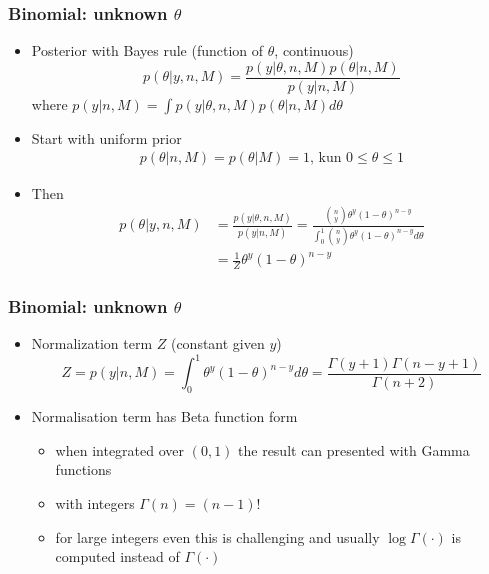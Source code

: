 \documentclass[english,t]{beamer}
\renewcommand{\emph}[1]{\textcolor{navyblue}{#1}}
\begin{document}
\begin{frame}
  \frametitle{Binomial: unknown $\theta$}

  \begin{itemize}
  \item Posterior with Bayes rule (function of $\theta$, continuous)
    \begin{equation*}
      p(\theta|y,n,M)=\frac{p(y|\theta,n,M)p(\theta|n,M)}{p(y|n,M)}
    \end{equation*}
    \pause
    where $p(y|n,M)=\int p(y|\theta,n,M)p(\theta|n,M) d\theta$
  \item<3-> Start with uniform prior
    \begin{align*}
      p(\theta|n,M)=p(\theta|M)=1,\, \text{kun}\,\, 0\leq\theta\leq 1
    \end{align*}
  \item<4-> Then
    \begin{align*}
      p(\theta|y,n,M)&=\frac{p(y|\theta,n,M)}{p(y|n,M)} 
      =\frac{\binom{n}{y} \theta^y(1-\theta)^{n-y}}{\int_0^1
        \binom{n}{y} \theta^y(1-\theta)^{n-y} d\theta} \\
        &=\frac{1}{Z}\theta^y(1-\theta)^{n-y}
    \end{align*}
  \end{itemize}

\end{frame}

\begin{frame}
  \frametitle{Binomial: unknown $\theta$}

  \begin{itemize}
  \item Normalization term $Z$ (constant given $y$)
    \begin{equation*}
      Z=p(y|n,M)= \int_0^1 \theta^y(1-\theta)^{n-y} d\theta = \frac{\Gamma(y+1)\Gamma(n-y+1)}{\Gamma(n+2)}
    \end{equation*}
  \item Normalisation term has \emph{Beta} function form 
    \begin{itemize}
    \item when integrated over $(0,1)$
      the result can presented with Gamma functions
    \item with integers  $\Gamma(n)=(n-1)!$
    \item for large integers even this is challenging and usually
      $\log \Gamma(\cdot)$ is computed instead of $\Gamma(\cdot)$
    \end{itemize}
  \end{itemize}

\end{frame}
\end{document}
